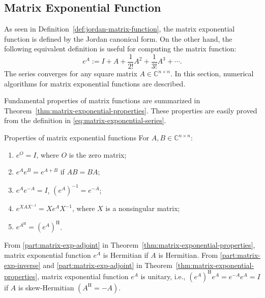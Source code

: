 \subsection{{Matrix Exponential Function}}\label{sec:matrix-exponential-function}

{As seen in Definition~\ref{def:jordan-matrix-function}, the matrix exponential function is defined by the Jordan canonical form. On the other hand, the following equivalent definition is useful for computing the matrix function:}
\begin{equation}\label{eq:matrix-exponential-series}e^A:=I+A+\frac{1}{2!}A^2+\frac{1}{3!}A^3+\cdots.\end{equation}
{The series converges for any square matrix $A\in\mathbb{C}^{n\times n}$. In this section, numerical algorithms for matrix exponential functions are described.}

{Fundamental properties of matrix functions are summarized in Theorem~\ref{thm:matrix-exponential-properties}. These properties are easily proved from the definition in \eqref{eq:matrix-exponential-series}.}

\begin{Theorem}{{Properties of matrix exponential functions}}\label{thm:matrix-exponential-properties}
{For $A,B\in\mathbb{C}^{n\times n}$:}
\begin{enumerate}[label=(\arabic*)]
\item\label{part:matrix-exp-zero} {$e^O=I$, where $O$ is the zero matrix;}
\item\label{part:matrix-exp-commuting-sum} {$e^Ae^B=e^{A+B}$ if $AB=BA$;}
\item\label{part:matrix-exp-inverse} $e^Ae^{-A}=I$, $(e^A)^{-1}=e^{-A}$;
\item\label{part:matrix-exp-similarity} {$e^{XAX^{-1}}=Xe^AX^{-1}$, where $X$ is a nonsingular matrix;}
\item\label{part:matrix-exp-adjoint} $e^{A^{\mathrm H}}=(e^A)^{\mathrm H}$.
\end{enumerate}
\end{Theorem}

{From \ref{part:matrix-exp-adjoint} in Theorem~\ref{thm:matrix-exponential-properties}, matrix exponential function $e^A$ is Hermitian if $A$ is Hermitian. From \ref{part:matrix-exp-inverse} and \ref{part:matrix-exp-adjoint} in Theorem~\ref{thm:matrix-exponential-properties}, matrix exponential function $e^A$ is unitary, i.e., $(e^A)^{\mathrm H}e^A=e^{-A}e^A=I$ if $A$ is skew-Hermitian $(A^{\mathrm H}=-A)$.}

